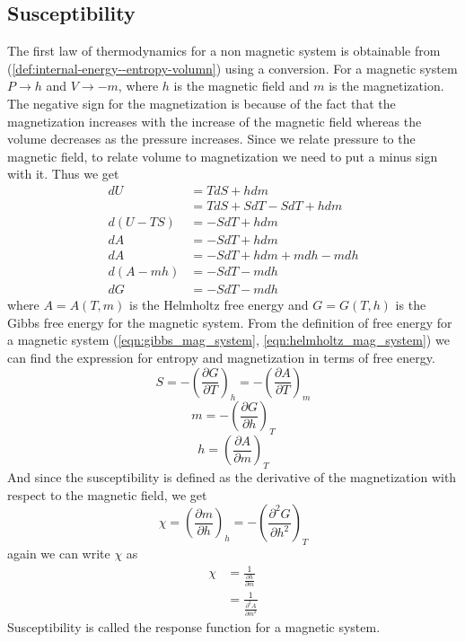 	\subsection{Susceptibility}
	The first law of thermodynamics for a non magnetic system is obtainable from (\ref{def:internal-energy--entropy-volumn}) using a conversion.	For a magnetic system $P \rightarrow h$ and $V \rightarrow -m$, where $h$ is the magnetic field and $m$ is the magnetization. The negative sign for the magnetization is because of the fact that the magnetization increases with the increase of the magnetic field whereas the volume decreases as the pressure increases. Since we relate pressure to the magnetic field, to relate volume to magnetization we need to put a minus sign with it. Thus we get
	\begin{align}
		dU &= TdS + hdm \\
		   &= TdS + SdT - SdT + h dm \\
		d(U - TS)  &= -SdT + h dm \\
		dA &= -SdT + h dm \label{eqn:helmholtz_mag_system} \\
		dA &= -SdT + h dm + m dh -m dh \\
		d(A - mh) &= -SdT - m dh\\
		dG &= -SdT -m dh \label{eqn:gibbs_mag_system}
	\end{align} 
	where $A=A(T,m)$ is the  Helmholtz free energy and $G=G(T,h)$ is the Gibbs free energy for the magnetic system. From the definition of free energy for a magnetic system (\ref{eqn:gibbs_mag_system}, \ref{eqn:helmholtz_mag_system}) we can find the expression for entropy and magnetization in terms of free energy.
	\begin{equation}
		S = -\left(\frac{\partial G}{\partial T}\right)_h = -\left(\frac{\partial A}{\partial T}\right)_m
	\end{equation}
	\begin{equation}
		m = -\left(\frac{\partial G}{\partial h}\right)_T
		\label{eqn:magnetization_def}
	\end{equation}
	\begin{equation}
		h = \left(\frac{\partial A}{\partial m}\right)_T
		\label{eqn:mag_field_def}
	\end{equation}	
	And since the susceptibility is defined as the derivative of the magnetization with respect to the magnetic field, we get
	\begin{equation}
		\chi = \left(\frac{\partial m}{\partial h}\right)_h = - \left(\frac{\partial^2G}{\partial h ^2}\right)_T
		\label{eqn:susceptibility_def}
	\end{equation}
	again we can write $\chi$ as
	\begin{align}
		\chi &= \frac{1}{\frac{\partial h}{\partial m}} \nonumber \\
			 &= \frac{1}{\frac{\partial^2 A}{\partial m ^2}} \label{eqn:susceptibility_def2}
	\end{align}
	Susceptibility is called the response function for a magnetic system.
	

